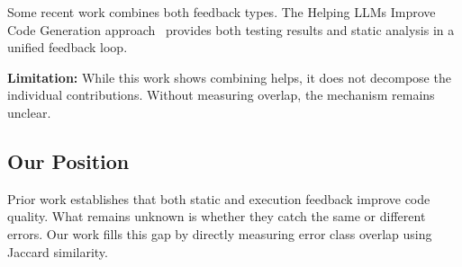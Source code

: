 Some recent work combines both feedback types. The Helping LLMs Improve Code Generation approach~\cite{helpingllms2024} provides both testing results and static analysis in a unified feedback loop.

\textbf{Limitation:} While this work shows combining helps, it does not decompose the individual contributions. Without measuring overlap, the mechanism remains unclear.

\subsection{Our Position}

Prior work establishes that both static and execution feedback improve code quality. What remains unknown is whether they catch the same or different errors. Our work fills this gap by directly measuring error class overlap using Jaccard similarity.
